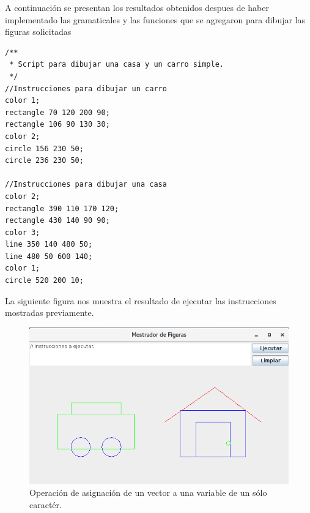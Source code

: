 A continuación se presentan los resultados obtenidos despues de haber implementado
las gramaticales y las funciones que se agregaron para dibujar las figuras solicitadas

\begin{lstlisting}
/**
 * Script para dibujar una casa y un carro simple.
 */
//Instrucciones para dibujar un carro
color 1;
rectangle 70 120 200 90;
rectangle 106 90 130 30;
color 2;
circle 156 230 50;
circle 236 230 50;

//Instrucciones para dibujar una casa
color 2;
rectangle 390 110 170 120;
rectangle 430 140 90 90;
color 3;
line 350 140 480 50;
line 480 50 600 140;
color 1;
circle 520 200 10;
\end{lstlisting}

La siguiente figura nos muestra el resultado de ejecutar las instrucciones mostradas 
previamente.

\begin{figure}[H]
	\begin{center}
		\includegraphics[scale=0.9]{images/img_ej_figs_awt}
		\caption{Operación de asignación de un vector a una variable de un sólo caractér.}
	\end{center}
\end{figure}

